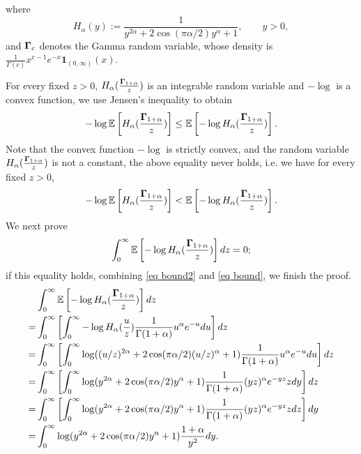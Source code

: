 \documentclass[12pt]{amsart}
\begin{document}
where $$   H_\alpha(y)
    :=\frac{1}{y^{2\alpha}+2\cos(\pi \alpha/2)y^\alpha+1},
    \qquad y>0,$$
and ${\bf \Gamma}_{c}$ denotes the Gamma random variable, whose density is $ \frac{1}{\Gamma(c)}x^{c-1}e^{-x}\mathbf{1}_{(0, \infty)}(x). $

For every fixed $z> 0$, $H_\alpha(\frac{{\bf \Gamma}_{1+\alpha}}{z})$ is an integrable random variable and $-\log$ is a convex function, we use Jensen's inequality to obtain 
\begin{equation}
    -\log \mathbb{E}\left[ H_\alpha(\frac{{\bf \Gamma}_{1+\alpha}}{z})\right] \leq   \mathbb{E}\left[ -\log H_\alpha(\frac{{\bf \Gamma}_{1+\alpha}}{z})\right].
\end{equation}
Note that the convex function $-\log$ is strictly convex, and the random variable $H_\alpha(\frac{{\bf \Gamma}_{1+\alpha}}{z})$ is not a constant, the above equality never holds, i.e. we have for every fixed $z > 0$, 
\begin{equation}\label{eq bound2}
    -\log \mathbb{E}\left[ H_\alpha(\frac{{\bf \Gamma}_{1+\alpha}}{z})\right] <   \mathbb{E}\left[ -\log H_\alpha(\frac{{\bf \Gamma}_{1+\alpha}}{z})\right].
\end{equation}
We next prove 
\begin{equation}
    \int_0^\infty  \mathbb{E}\left[ -\log H_\alpha(\frac{{\bf \Gamma}_{1+\alpha}}{z})\right] dz  = 0; 
\end{equation}
if this equality holds, combining \eqref{eq bound2}  and \eqref{eq bound}, we finish the proof. 
\begin{align}
   &  \int_0^\infty  \mathbb{E}\left[ -\log H_\alpha(\frac{{\bf \Gamma}_{1+\alpha}}{z})\right] dz \\
 = &   \int_0^\infty \left[ \int_0^\infty  -\log H_\alpha(\frac{u}{z}) \frac{1}{\Gamma(1+\alpha) }u^\alpha e^{-u} du\right] dz\\
= &    \int_0^\infty \left[ \int_0^\infty  \log ((u/z)^{2\alpha} + 2\cos(\pi \alpha/2)(u/z)^\alpha + 1) \frac{1}{\Gamma(1+\alpha) }u^\alpha e^{-u}du \right] dz\\
= &   \int_0^\infty \left[ \int_0^\infty  \log (y^{2\alpha} + 2\cos(\pi \alpha/2)y^\alpha + 1) \frac{1}{\Gamma(1+\alpha) }(yz)^\alpha e^{-yz} zdy \right] dz \\
\label{eq using Fubini}
= & \int_0^\infty \left[ \int_0^\infty  \log (y^{2\alpha} + 2\cos(\pi \alpha/2)y^\alpha + 1) \frac{1}{\Gamma(1+\alpha) }(yz)^\alpha e^{-yz} zdz \right] dy  \\
\label{eq last step}
= &  \int_0^\infty  \log (y^{2\alpha} + 2\cos(\pi \alpha/2)y^\alpha + 1) \frac{1+\alpha}{y^2}  dy. 
\end{align}
\end{document}
